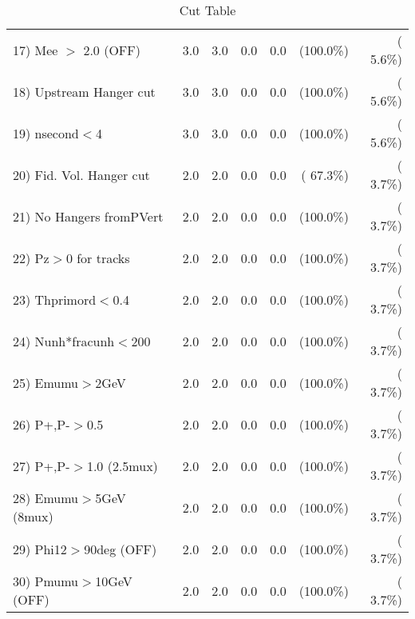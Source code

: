 \begin{table}[h!]
\begin{tabular}{||l||r|r|r|r|r|r||}
 17) Mee $>$ 2.0  (OFF)   &          3.0 &          3.0 &          0.0 &          0.0 & (100.0\%) & (  5.6\%) \\
 18) Upstream Hanger cut  &          3.0 &          3.0 &          0.0 &          0.0 & (100.0\%) & (  5.6\%) \\
 19) nsecond$<$4          &          3.0 &          3.0 &          0.0 &          0.0 & (100.0\%) & (  5.6\%) \\
 20) Fid. Vol. Hanger cut &          2.0 &          2.0 &          0.0 &          0.0 & ( 67.3\%) & (  3.7\%) \\
 21) No Hangers fromPVert &          2.0 &          2.0 &          0.0 &          0.0 & (100.0\%) & (  3.7\%) \\
 22) Pz$>$0 for tracks    &          2.0 &          2.0 &          0.0 &          0.0 & (100.0\%) & (  3.7\%) \\
 23) Thprimord$<$0.4      &          2.0 &          2.0 &          0.0 &          0.0 & (100.0\%) & (  3.7\%) \\
 24) Nunh*fracunh$<$200   &          2.0 &          2.0 &          0.0 &          0.0 & (100.0\%) & (  3.7\%) \\
 25) Emumu$>$2GeV         &          2.0 &          2.0 &          0.0 &          0.0 & (100.0\%) & (  3.7\%) \\
 26) P+,P-$>$0.5          &          2.0 &          2.0 &          0.0 &          0.0 & (100.0\%) & (  3.7\%) \\
 27) P+,P-$>$1.0 (2.5mux) &          2.0 &          2.0 &          0.0 &          0.0 & (100.0\%) & (  3.7\%) \\
 28) Emumu$>$5GeV  (8mux) &          2.0 &          2.0 &          0.0 &          0.0 & (100.0\%) & (  3.7\%) \\
 29) Phi12$>$90deg  (OFF) &          2.0 &          2.0 &          0.0 &          0.0 & (100.0\%) & (  3.7\%) \\
 30) Pmumu$>$10GeV  (OFF) &          2.0 &          2.0 &          0.0 &          0.0 & (100.0\%) & (  3.7\%) \\
 \hline
 \hline
 \end{tabular}
 \caption{Cut Table           }
 \label{tab-cutcohjpsi-mumu_anuecc}
 \end{table}
